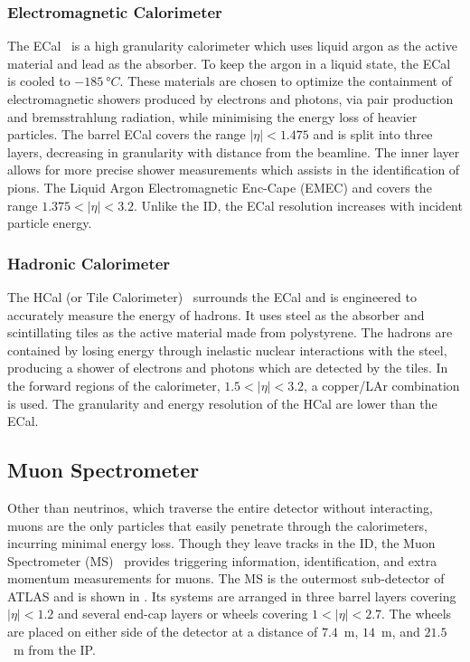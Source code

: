 \subsubsection{Electromagnetic Calorimeter}

The ECal~\cite{ATLASECal} is a high granularity calorimeter which uses liquid argon as the active material and lead as the absorber.
To keep the argon in a liquid state, the ECal is cooled to $-185~\unit{\degree C}$.
These materials are chosen to optimize the containment of electromagnetic showers produced by electrons and photons, via pair production and bremsstrahlung radiation, while minimising the energy loss of heavier particles.
The barrel ECal covers the range $|\eta| < 1.475$ and is split into three layers, decreasing in granularity with distance from the beamline.
The inner layer allows for more precise shower measurements which assists in the identification of pions.
The Liquid Argon Electromagnetic Enc-Cape (EMEC) and covers the range $1.375 < |\eta| < 3.2$.
Unlike the ID, the ECal resolution increases with incident particle energy.

\subsubsection{Hadronic Calorimeter}

The HCal (or Tile Calorimeter)~\cite{ATLASHCal} surrounds the ECal and is engineered to accurately measure the energy of hadrons.
It uses steel as the absorber and scintillating tiles as the active material made from polystyrene.
The hadrons are contained by losing energy through inelastic nuclear interactions with the steel, producing a shower of electrons and photons which are detected by the tiles.
In the forward regions of the calorimeter, $1.5 < |\eta| < 3.2$, a copper/LAr combination is used.
The granularity and energy resolution of the HCal are lower than the ECal.

\subsection{Muon Spectrometer}

Other than neutrinos, which traverse the entire detector without interacting, muons are the only particles that easily penetrate through the calorimeters, incurring minimal energy loss.
Though they leave tracks in the ID, the Muon Spectrometer (MS)~\cite{ATLASMuon,ATLASRun3} provides triggering information, identification, and extra momentum measurements for muons.
The MS is the outermost sub-detector of ATLAS and is shown in .
Its systems are arranged in three barrel layers covering $|\eta| < 1.2$ and several end-cap layers or wheels covering $1 < |\eta| < 2.7$.
The wheels are placed on either side of the detector at a distance of $7.4$~m, $14$~m, and $21.5$~m from the IP.

